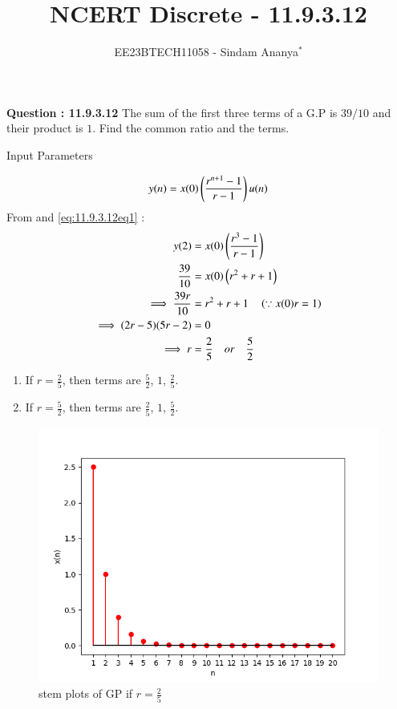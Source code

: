 \documentclass[journal,12pt,twocolumn]{IEEEtran}
\theoremstyle{remark}
\begin{document}

\vspace{3cm}

\title{NCERT Discrete - 11.9.3.12}
\author{EE23BTECH11058 - Sindam Ananya$^{*}$%
}
\maketitle
\newpage
\bigskip

\renewcommand{\thefigure}{\theenumi}
\renewcommand{\thetable}{\theenumi}

\vspace{3cm}
\textbf{Question : 11.9.3.12} 
The sum of the first three terms of a G.P is $39/10$ and their product is $1$. Find the common ratio and the terms.\\
\solution
\begin{table}[h!]
    \centering
    
    \caption{Input Parameters}
    \label{tab:11.9.3.12table1}
\end{table}
\begin{equation}
y(n) = x(0)\left(\frac{r^{n+1}-1}{r-1}\right)u(n)
\label{eq:11.9.3.12eq1}
\end{equation}
From  and \eqref{eq:11.9.3.12eq1} :
\begin{align}
y(2) &= x(0)\left(\frac{r^3-1}{r-1}\right)\\
\frac{39}{10} &= x(0)\left(r^2+r+1\right)\\
\implies \frac{39r}{10} &= r^2+r+1 \quad \left(\because x(0)r = 1\right)\\
\implies (2r-5)(5r-2) &=0\\
\implies r &= \frac{2}{5} \quad or \quad \frac{5}{2}
\end{align}
\begin{enumerate}
      \item If $r = \frac{2}{5}$, then terms are $\frac{5}{2}$, $1$, $\frac{2}{5}$.
      \item If $r = \frac{5}{2}$, then terms are $\frac{2}{5}$, $1$, $\frac{5}{2}$.
\end{enumerate}
\begin{figure}[h!]
    \centering
    \includegraphics[width=\columnwidth]{figs/graph1.png}
    \caption{stem plots of GP if $r=\frac{2}{5}$}
    \label{fig:11.9.3.12_1}
\end{figure}
\end{document}
